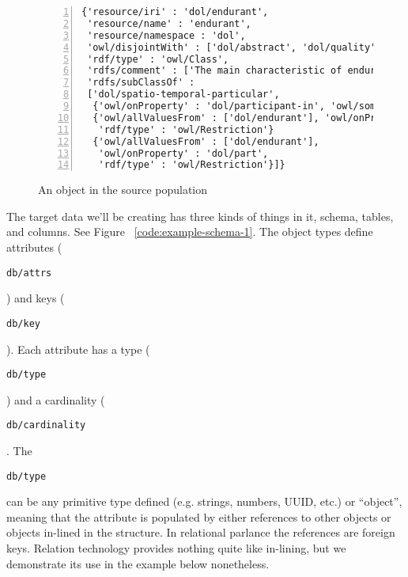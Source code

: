 \documentclass[9pt,letterpaper]{article}
\newcommand{\stt}[1]{\begin{footnotesize}\texttt{#1}\end{footnotesize}}
\begin{document}
\begin{figure}[H]
  \caption{An object in the source population}
  \label{code:endurant}
\begin{lstlisting}[numberstyle=\scriptsize,basicstyle=\ttfamily\scriptsize,numbers=left,stepnumber=1,breaklines=true]
{'resource/iri' : 'dol/endurant',
 'resource/name' : 'endurant',
 'resource/namespace : 'dol',
 'owl/disjointWith' : ['dol/abstract', 'dol/quality', 'dol/perdurant'],
 'rdf/type' : 'owl/Class',
 'rdfs/comment' : ['The main characteristic of endurants is that all of them are independent essential wholes...'],
 'rdfs/subClassOf' :
 ['dol/spatio-temporal-particular',
  {'owl/onProperty' : 'dol/participant-in', 'owl/someValuesFrom' : ['dol/perdurant'], 'rdf/type' : 'owl/Restriction'},
  {'owl/allValuesFrom' : ['dol/endurant'], 'owl/onProperty' : 'dol/specific-constant-constituent',
   'rdf/type' : 'owl/Restriction'}
  {'owl/allValuesFrom' : ['dol/endurant'],
   'owl/onProperty' : 'dol/part',
   'rdf/type' : 'owl/Restriction'}]}
\end{lstlisting}
\end{figure}

The target data we'll be creating has three kinds of things in it, schema, tables, and columns.
See Figure ~\ref{code:example-schema-1}.
The object types define attributes (\stt{db/attrs}) and keys (\stt{db/key}).
Each attribute has a type (\stt{db/type}) and a cardinality (\stt{db/cardinality}.
The \stt{db/type} can be any primitive type defined (e.g. strings, numbers, UUID, etc.) or ``object'', meaning that
the attribute is populated by either references to other objects or objects in-lined in the structure.
In relational parlance the references are foreign keys.
Relation technology provides nothing quite like in-lining, but we demonstrate its use in the example below nonetheless.
\end{document}
